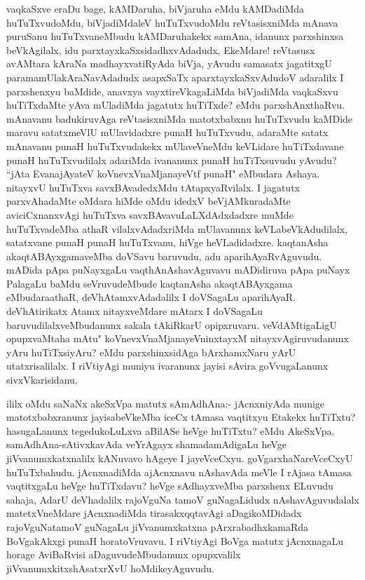 \begin{artha}
vaqkaSxve eraDu bage, kAMDaruha, biVjaruha eMdu kAMDadiMda huTuTxvudoMdu, biVjadiMdaleV huTuTxvudoMdu reVtasisxniMda mAnava puruSanu huTuTxvaneMbudu kAMDaruhakekx samAna, idanunx parxshinxsa beVkAgilalx, idu parxtayxkaSxsidadhxvAdadudx, EkeMdare! reVtasusx avAMtara kAraNa madhayxvatiRyAda biVja, yAvudu samasatx jagatitxgU paramamUlakAraNavAdadudx asapxSaTx aparxtayxkaSxvAdudoV adaralilx I parxshenxyu baMdide, anavxya vayxtireVkagaLiMda biVjadiMda vaqkaSxvu huTiTxdaMte yAva mUladiMda jagatutx huTiTxde? eMdu parxshAnxthaRvu. mAnavanu badukiruvAga reVtasisxniMda matotxbabxnu huTuTxvudu kaMDide maravu satatxmeVlU mUlavidadxre punaH huTuTxvudu, adaraMte satatx mAnavanu punaH huTuTxvudakekx mUlaveVneMdu keVLidare huTiTxdavane punaH huTuTxvudilalx adariMda ivananunx punaH huTiTxsuvudu yAvudu? ``jAta EvanajAyateV koVnevxVnaMjanayeVtf punaH" eMbudara Ashaya. nitayxvU huTuTxva savxBAvadedxMdu tAtapxyaRvilalx. I jagatutx parxvAhadaMte oMdara hiMde oMdu idedxV beVjAMkuradaMte aviciCxnanxvAgi huTuTxva savxBAvavuLaLXdAdxdadxre muMde huTuTxvadeMba athaR vilalxvAdadxriMda mUlavanunx keVLabeVkAdudilalx, satatxvane punaH punaH huTuTxvanu, hiVge heVLadidadxre. kaqtanAsha akaqtABAyxgamaveMba doVSavu baruvudu, adu aparihAyaRvAguvudu. mADida pApa puNayxgaLu vaqthAnAshavAguvavu mADidiruva pApa puNayx PalagaLu baMdu seVruvudeMbude kaqtanAsha akaqtABAyxgama eMbudaraathaR, deVhAtamxvAdadalilx I doVSagaLu aparihAyaR. deVhAtirikatx Atamx nitayxveMdare mAtarx I doVSagaLu baruvudilalxveMbudanunx sakala tAkiRkarU opipxruvaru. veVdAMtigaLigU opupxvaMtaha mAtu" koVnevxVnaMjanayeVninxtayxM nitayxvAgiruvudanunx yAru huTiTxsiyAru? eMdu parxshinxsidAga bArxhamxNaru yArU utatxrisalilalx. I riVtiyAgi muniyu ivaranunx jayisi sAvira goVvugaLanunx sivxVkarisidanu.
\end{artha}%


\begin{artha}
ililx oMdu saNaNx akeSxVpa matutx sAmAdhAna:- jAcnxniyAda munige matotxbabxranunx jayisabeVkeMba iceCx tAmasa vaqtitxyu Etakekx huTiTxtu? hasugaLanunx tegedukoLuLxva aBilASe heVge huTiTxtu? eMdu AkeSxVpa. samAdhAna-sAtivxkavAda veYrAgayx shamadamAdigaLu heVge jiVvanumxkatxnalilx kANuvavo hAgeye I jayeVceCxyu. goVgarxhaNareVceCxyU huTuTxbahudu. jAcnxnadiMda ajAcnxnavu nAshavAda meVle I rAjasa tAmasa vaqtitxgaLu heVge huTiTxdavu? heVge sAdhayxveMba parxshenx ELuvudu sahaja, AdarU deVhadalilx rajoVguNa tamoV guNagaLidudx nAshavAguvudalalx matetxVneMdare jAcnxnadiMda tirasakxqqtavAgi aDagikoMDidadx rajoVguNatamoV guNagaLu jiVvanumxkatxna pArxrabadhxkamaRda BoVgakAkxgi punaH horatoVruvavu. I riVtiyAgi BoVga matutx jAcnxnagaLu horage AviBaRvisi aDaguvudeMbudanunx opupxvalilx jiVvanumxkitxshAsatxrXvU hoMdikeyAguvudu. 
\end{artha}

